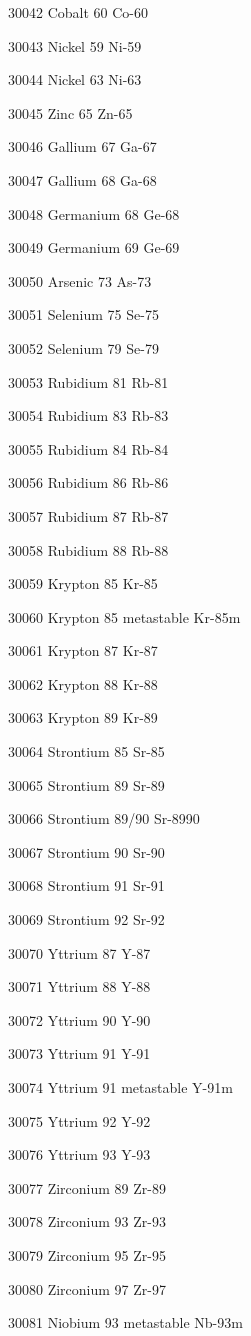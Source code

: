 30042 Cobalt 60 Co-60

30043 Nickel 59 Ni-59

30044 Nickel 63 Ni-63

30045 Zinc 65 Zn-65

30046 Gallium 67 Ga-67

30047 Gallium 68 Ga-68

30048 Germanium 68 Ge-68

30049 Germanium 69 Ge-69

30050 Arsenic 73 As-73

30051 Selenium 75 Se-75

30052 Selenium 79 Se-79

30053 Rubidium 81 Rb-81

30054 Rubidium 83 Rb-83

30055 Rubidium 84 Rb-84

30056 Rubidium 86 Rb-86

30057 Rubidium 87 Rb-87

30058 Rubidium 88 Rb-88

30059 Krypton 85 Kr-85

30060 Krypton 85 metastable Kr-85m

30061 Krypton 87 Kr-87

30062 Krypton 88 Kr-88

30063 Krypton 89 Kr-89

30064 Strontium 85 Sr-85

30065 Strontium 89 Sr-89

30066 Strontium 89/90 Sr-8990

30067 Strontium 90 Sr-90

30068 Strontium 91 Sr-91

30069 Strontium 92 Sr-92

30070 Yttrium 87 Y-87

30071 Yttrium 88 Y-88

30072 Yttrium 90 Y-90

30073 Yttrium 91 Y-91

30074 Yttrium 91 metastable Y-91m

30075 Yttrium 92 Y-92

30076 Yttrium 93 Y-93

30077 Zirconium 89 Zr-89

30078 Zirconium 93 Zr-93

30079 Zirconium 95 Zr-95

30080 Zirconium 97 Zr-97

30081 Niobium 93 metastable Nb-93m

